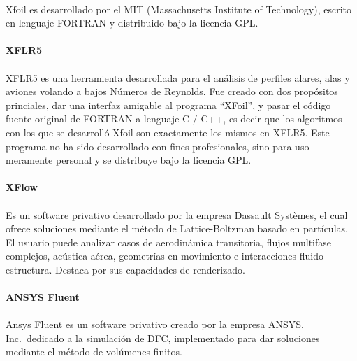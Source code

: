 \documentclass[letterpaper, openright, 12pt]{book}
\begin{document}
    \paragraph*{}
    Xfoil es desarrollado por el MIT (Massachusetts Institute of
    Technology), escrito en lenguaje FORTRAN y distribuido bajo
    la licencia GPL.

    \paragraph*{XFLR5}
    \paragraph*{}
    XFLR5 es una herramienta desarrollada para el análisis de perfiles alares,
    alas y aviones volando a bajos Números de Reynolds. Fue creado con dos
    propósitos princiales, dar una interfaz amigable al programa ``XFoil'', y
    pasar el código fuente original de FORTRAN a lenguaje C / C++, es decir que
    los algoritmos con los que se desarrolló Xfoil son exactamente los mismos
    en XFLR5.\cite{xflr5} Este programa no ha sido desarrollado con fines
    profesionales, sino para uso meramente personal y se distribuye bajo la
    licencia GPL.

    \paragraph*{XFlow}
    \paragraph*{}
    Es un software privativo desarrollado por la empresa Dassault Systèmes, el
    cual ofrece soluciones mediante el método de Lattice-Boltzman basado en
    partículas. El usuario puede analizar casos de aerodinámica transitoria,
    flujos multifase complejos, acústica aérea, geometrías en movimiento e
    interacciones fluido-estructura. Destaca por sus capacidades de
    renderizado.\cite{xflow}

    \paragraph*{ANSYS Fluent}
    \paragraph*{}
    Ansys Fluent es un software privativo creado por la empresa ANSYS, Inc.\
    dedicado a la simulación de DFC, implementado para dar soluciones mediante
    el método de volúmenes finitos.
\end{document}
